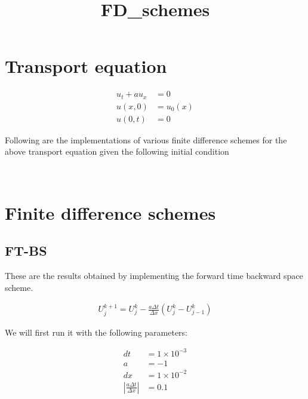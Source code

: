 \documentclass[11pt]{article}
\title{FD\_schemes}
\begin{document}
    
    
    \maketitle
    
    

    
    \section{Transport equation}\label{transport-equation}

\begin{align}
u_t + a u_x &= 0\\
u(x,0) &= u_0(x)\\
u(0,t) &= 0
\end{align}

Following are the implementations of various finite difference schemes
for the above transport equation given the following initial condition

    \begin{center}
    \end{center}
    { \hspace*{\fill} \\}
    
    \section{Finite difference schemes}\label{finite-difference-schemes}

    \subsection{FT-BS}\label{ft-bs}

These are the results obtained by implementing the forward time backward
space scheme.

\begin{align}
U_j^{k+1} = U_j^k - \frac{a \Delta t}{\Delta x}\left( U_j^k - U_{j-1}^k\right)
\end{align}

We will first run it with the following parameters:

\begin{align}
dt &= 1 \times 10^{-3}\\
a  &= -1\\
dx &= 1 \times 10^{-2}\\
\left| \frac{a \Delta t}{\Delta x} \right| &= 0.1
\end{align}
\end{document}
